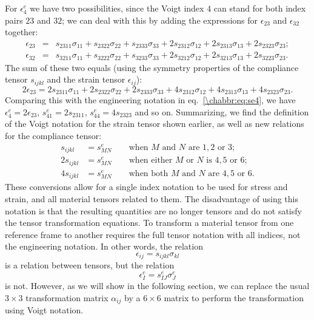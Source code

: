 For $\epsilon^e_4$ we have two possibilities, since the Voigt index $4$ can stand for both index pairs $23$ and $32$;  we can deal with this by adding the expressions for $\epsilon_{23}$ and $\epsilon_{32}$ together:
\begin{eqnarray}
	\epsilon_{23} &=& s_{2311}\sigma_{11} + s_{2322}\sigma_{22} + s_{2333}\sigma_{33} + 2 s_{2312}\sigma_{12} +2 s_{2313}\sigma_{13} +2 s_{2323}\sigma_{23};\\
	\epsilon_{32} &=& s_{3211}\sigma_{11} + s_{3222}\sigma_{22} + s_{3233}\sigma_{33} + 2 s_{3212}\sigma_{12} +2 s_{3213}\sigma_{13} +2 s_{3223}\sigma_{23}.
\end{eqnarray}
The sum of these two equals (using the symmetry properties of the compliance tensor $s_{ijkl}$ and the strain tensor $\epsilon_{ij}$):
\[
	2\epsilon_{23} = 2s_{2311}\sigma_{11}+2s_{2322}\sigma_{22} + 2s_{2333}\sigma_{33} + 4 s_{2312}\sigma_{12} +4 s_{2313}\sigma_{13} +4 s_{2323}\sigma_{23}.
\]
Comparing this with the engineering notation in eq.~\ref{\chabbr:eq:se4}, we have $\epsilon_4^e=2\epsilon_{23}$, $s^e_{41}=2s_{2311}$, $s^e_{44}=4s_{2323}$ and so on.  Summarizing, we find the definition of the Voigt notation for the strain tensor shown earlier, as well as new relations for the compliance tensor:
\begin{subequations}\begin{align}
	s_{ijkl} &= s^e_{MN} \qquad\mbox{when $M$ and $N$ are $1,2$ or $3$};\\
	2s_{ijkl} &= s^e_{MN} \qquad\mbox{when either $M$ or $N$ is $4,5$ or $6$};\\
	4s_{ijkl} &= s^e_{MN} \qquad\mbox{when both $M$ and $N$ are $4,5$ or $6$}.
\end{align}\end{subequations}
These conversions allow for a single index notation to be used for stress and strain, and all material tensors related to them.  The disadvantage of using this notation is that the resulting quantities are no longer tensors and do not satisfy the tensor transformation equations.  To transform a material tensor from one reference frame to another requires the full tensor notation with all indices, not the engineering notation.  In other words, the relation
\[
	\epsilon_{ij} = s_{ijkl}\sigma_{kl}
\]
is a relation between tensors, but the relation
\[
	\epsilon^e_{I} = s^e_{IJ}\sigma^e_J
\]
is not.  However, as we will show in the following section, we can replace the usual $3\times 3$ transformation matrix $\alpha_{ij}$ by a $6\times 6$ matrix to perform the transformation using Voigt notation.

